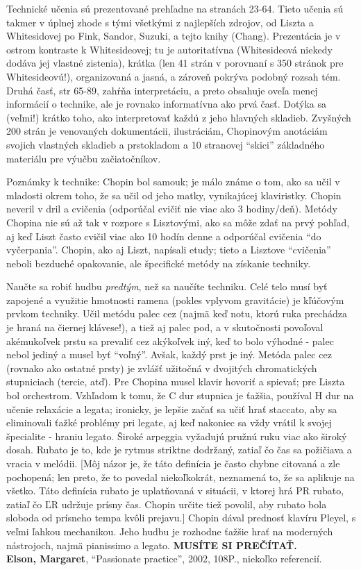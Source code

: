 \documentclass[11pt,a4paper]{book}
\begin{document}
Technické učenia sú prezentované prehľadne na stranách 23-64. Tieto učenia sú takmer v úplnej zhode s tými všetkými z najlepších zdrojov, od Liszta a Whitesidovej po Fink, Sandor, Suzuki, a tejto knihy (Chang). Prezentácia je v ostrom kontraste k Whitesideovej; tu je autoritatívna (Whitesideová niekedy dodáva jej vlastné zistenia), krátka (len 41 strán v porovnaní s 350 stránok pre Whitesideovú!), organizovaná a jasná, a zároveň pokrýva podobný rozsah tém. Druhá časť, str 65-89, zahŕňa interpretáciu, a preto obsahuje oveľa menej informácií o technike, ale je rovnako informatívna ako prvá časť. Dotýka sa (veľmi!) krátko toho, ako interpretovať každú z jeho hlavných skladieb. Zvyšných 200 strán je venovaných dokumentácii, ilustráciám, Chopinovým anotáciám svojich vlastných skladieb a prstokladom a 10 stranovej “skici” základného materiálu pre výučbu začiatočníkov. 

Poznámky k technike: Chopin bol samouk; je málo známe o tom, ako sa učil v mladosti okrem toho, že sa učil od jeho matky, vynikajúcej klaviristky. Chopin neveril v dril a cvičenia (odporúčal cvičiť nie viac ako 3 hodiny/deň). Metódy Chopina nie sú až tak v rozpore s Lisztovými, ako sa môže zdať na prvý pohľad, aj keď Liszt často cvičil viac ako 10 hodín denne a odporúčal cvičenia “do vyčerpania”. Chopin, ako aj Liszt, napísali etudy; tieto a Lisztove “cvičenia” neboli bezduché opakovanie, ale špecifické metódy na získanie techniky. 

Naučte sa robiť hudbu \textit{predtým}, než sa naučíte techniku. Celé telo musí byť zapojené a využitie hmotnosti ramena (pokles vplyvom gravitácie) je kľúčovým prvkom techniky. Učil metódu palec cez (najmä keď notu, ktorú ruka prechádza je hraná na čiernej klávese!), a tiež aj palec pod, a v skutočnosti povoľoval akémukoľvek prstu sa prevaliť cez akýkoľvek iný, keď to bolo výhodné - palec nebol jediný a musel byť “voľný”. Avšak, každý prst je iný. Metóda palec cez (rovnako ako ostatné prsty) je zvlášť užitočná v dvojitých chromatických stupniciach (tercie, atď). Pre Chopina musel klavir hovoriť a spievať; pre Liszta bol orchestrom. Vzhľadom k tomu, že C dur stupnica je ťažšia, používal H dur na učenie relaxácie a legata; ironicky, je lepšie začať sa učiť hrať staccato, aby sa eliminovali ťažké problémy pri legate, aj keď nakoniec sa vždy vrátil k svojej špecialite - hraniu legato. Široké arpeggia vyžadujú pružnú ruku viac ako široký dosah. Rubato je to, kde je rytmus striktne dodržaný, zatiaľ čo čas sa požičiava a vracia v melódii. [Môj názor je, že táto definícia je často chybne citovaná a zle pochopená; len preto, že to povedal niekoľkokrát, neznamená to, že sa aplikuje na všetko. Táto definícia rubato je uplatňovaná v situácii, v ktorej hrá PR rubato, zatiaľ čo ĽR udržuje prísny čas. Chopin určite tiež povolil, aby rubato bola sloboda od prísneho tempa kvôli prejavu.] Chopin dával prednosť klavíru Pleyel, s veľmi ľahkou mechanikou. Jeho hudbu je rozhodne ťažšie hrať na moderných nástrojoch, najmä pianissimo a legato. \textbf{MUSÍTE SI PREČÍTAŤ.}
\medskip\\
\textbf{Elson, Margaret}, “Passionate practice”, 2002, 108P., niekoľko referencií. 
\end{document}
